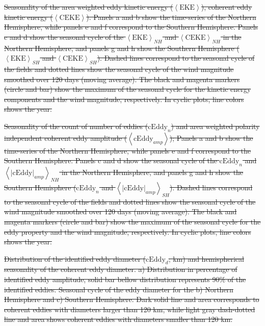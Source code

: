 \documentclass[draft,linenumbers]{agujournal2019}
\newcommand{\EKE}{\textrm{EKE}}
\newcommand{\CEKE}{\textrm{CEKE}}
\newcommand{\cEddy}{\textrm{cEddy}}
\providecommand{\DIFdel}[1]{{\protect\color{red}\sout{#1}}}                      %
\providecommand{\DIFdelFL}[1]{\DIFdel{#1}} %
\begin{document}
\DIFdel{Seasonality of the area weighted eddy kinetic energy ($\left<\EKE\right>$), coherent eddy kinetic energy ($\left<\CEKE\right>$). 
	Panels a and b show the time-series of the Northern Hemisphere, while panels e and f correspond to the Southern Hemisphere. Panels c and d show the seasonal cycle of the $\left<\EKE\right>_{NH}$ and $\left<\CEKE\right>_{NH}$ in the Northern Hemisphere, and panels g and h show the Southern Hemisphere ($\left<\EKE\right>_{SH}$ and $\left<\CEKE\right>_{SH}$).
	Dashed lines correspond to the seasonal cycle of the fields and dotted lines show the seasonal cycle of the wind magnitude smoothed over 120 days (moving average). 
	The black and magenta markers (circle and bar) show the maximum of the seasonal cycle for the kinetic energy components and the wind magnitude, respectively. In cyclic plots, line colors shows the year.
}%

{%
\DIFdelFL{Seasonality of the count of number of eddies ($\cEddy
		_n$) and area weighted polarity independent coherent eddy amplitude ($\left<\cEddy_{amp}\right>$); Panels a and b show the time-series of the Northern Hemisphere, while panels e and f correspond to the Southern Hemisphere. Panels c and d show the seasonal cycle of the $\cEddy_n$ and $\left<|\cEddy|_{amp}\right>_{NH}$ in the Northern Hemisphere, and panels g and h show the Southern Hemisphere ($\cEddy_n$ and $\left<|\cEddy|_{amp}\right>_{SH}$).
		Dashed lines correspond to the seasonal cycle of the fields and dotted lines show the seasonal cycle of the wind magnitude smoothed over 120 days (moving average). 
		The black and magenta markers (circle and bar) show the maximum of the seasonal cycle for the eddy property  and the wind magnitude, respectively. In cyclic plots, line colors shows the year.}}

{%
\DIFdelFL{Distribution of the identified eddy diameter ($\cEddy_d$; km) and hemispherical seasonality of the coherent eddy diameter. a) Distribution in percentage of identified eddy amplitude, solid bar bellow distribution represents 90\% of the identified eddies. Seasonal cycle of the eddy diameter for the b) Northern Hemisphere and c) Southern Hemisphere. Dark solid line and area corresponds to coherent eddies with diameters larger than 120 km, while light gray dash-dotted line and area shows coherent eddies with diameters smaller than 120 km.}}
\end{document}
